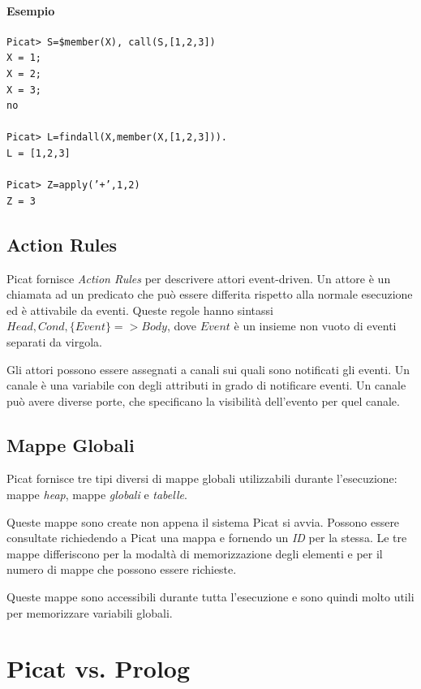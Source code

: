 \documentclass[12pt,a4paper,openright]{book}  %
\begin{document}
\paragraph{Esempio}
\begin{verbatim}
Picat> S=$member(X), call(S,[1,2,3])
X = 1;
X = 2;
X = 3;
no

Picat> L=findall(X,member(X,[1,2,3])).
L = [1,2,3]

Picat> Z=apply(’+’,1,2)
Z = 3
\end{verbatim}

\subsection{Action Rules}
\label{subsec:picat_advanced_actionrules}

Picat fornisce \emph{Action Rules} per descrivere attori
event-driven. Un attore è un chiamata ad un predicato che può essere
differita rispetto alla normale esecuzione ed è attivabile da
eventi. Queste regole hanno sintassi $Head, Cond, \{Event\} => Body$,
dove $Event$ è un insieme non vuoto di eventi separati da virgola.

Gli attori possono essere assegnati a canali sui quali sono notificati
gli eventi. Un canale è una variabile con degli attributi in grado di
notificare eventi. Un canale può avere diverse porte, che specificano
la visibilità dell'evento per quel canale.

\subsection{Mappe Globali}
\label{subsec:picat_advanced_globalmaps}

Picat fornisce tre tipi diversi di mappe globali utilizzabili durante
l'esecuzione: mappe \emph{heap}, mappe \emph{globali} e
\emph{tabelle}.

Queste mappe sono create non appena il sistema Picat si avvia. Possono
essere consultate richiedendo a Picat una mappa e fornendo un
\emph{ID} per la stessa. Le tre mappe differiscono per la modaltà di
memorizzazione degli elementi e per il numero di mappe che possono
essere richieste.

Queste mappe sono accessibili durante tutta l'esecuzione e sono quindi
molto utili per memorizzare variabili globali.

\section{Picat vs. Prolog}
\label{sec:picat_picatvsprolog}
\end{document}
